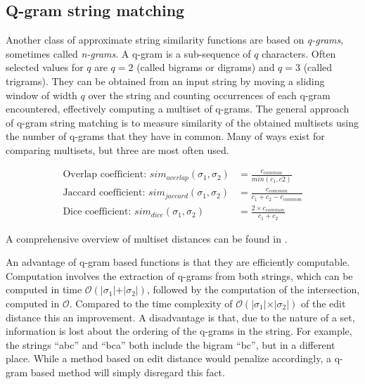 
\subsection{Q-gram string matching}
\label{subsec:qgram}

Another class of approximate string similarity functions are based on \emph{q-grams}, sometimes called \emph{n-grams}.
A q-gram is a sub-sequence of $q$ characters.
Often selected values for $q$ are $q=2$ (called bigrams or digrams) and $q=3$ (called trigrams).
They can be obtained from an input string by moving a sliding window of width $q$ over the string and counting occurrences of each q-gram encountered, effectively computing a multiset of q-grams.
The general approach of q-gram string matching is to measure similarity of the obtained multisets using the number of q-grams that they have in common.
Many of ways exist for comparing multisets, but three are most often used.

\begin{align}
    \text{Overlap coefficient: }sim_{overlap}(\sigma_1, \sigma_2) &= \frac{c_{common}}{min(c_1, c2)} \\
    \text{Jaccard coefficient: }sim_{jaccard}(\sigma_1, \sigma_2) &= \frac{c_{common}}{c_1 + c_2 - c_{common}} \\
    \text{Dice coefficient: }sim_{dice}(\sigma_1, \sigma_2) &= \frac{2 \times c_{common}}{c_1 + c_2}
\end{align}

\noindent A comprehensive overview of multiset distances can be found in \citep{Kosters2008}.

An advantage of q-gram based functions is that they are efficiently computable.
Computation involves the extraction of q-grams from both strings, which can be computed in time $\mathcal{O}(\vert \sigma_1 \vert + \vert \sigma_2 \vert)$, followed by the computation of the intersection, computed in $\mathcal{O}$.
Compared to the time complexity of $\mathcal{O}(\vert \sigma_1 \vert \times \vert \sigma_2 \vert)$ of the edit distance this an improvement.
A disadvantage is that, due to the nature of a set, information is lost about the ordering of the q-grams in the string.
For example, the strings ``abc'' and ``bca'' both include the bigram ``bc'', but in a different place.
While a method based on edit distance would penalize accordingly, a q-gram based method will simply disregard this fact.




